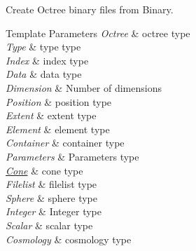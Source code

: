 Create Octree binary files from Binary. 
\begin{DoxyTemplParams}{Template Parameters}
{\em Octree} & octree type \\
\hline
{\em Type} & type type \\
\hline
{\em Index} & index type \\
\hline
{\em Data} & data type \\
\hline
{\em Dimension} & Number of dimensions \\
\hline
{\em Position} & position type \\
\hline
{\em Extent} & extent type \\
\hline
{\em Element} & element type \\
\hline
{\em Container} & container type \\
\hline
{\em Parameters} & Parameters type \\
\hline
{\em \hyperlink{exceptionCone}{Cone}} & cone type \\
\hline
{\em Filelist} & filelist type \\
\hline
{\em Sphere} & sphere type \\
\hline
{\em Integer} & Integer type \\
\hline
{\em Scalar} & scalar type \\
\hline
{\em Cosmology} & cosmology type \\
\hline
\end{DoxyTemplParams}

